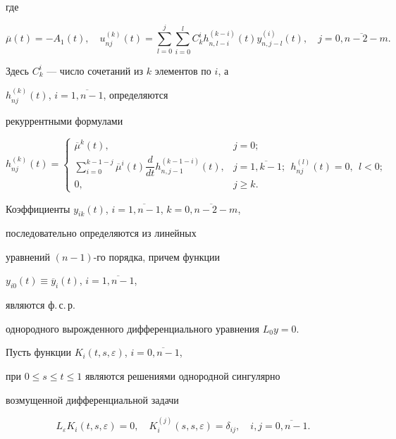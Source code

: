 где


$$


\overline{\mu}(t)=-A_{1}(t),


\quad


u_{nj}^{(k)}(t)=\sum_{l=0}^{j}\sum_{i=0}^{l}


C_{k}^{i}h_{n,l-i}^{(k-i)}(t)y_{n,j-l}^{(i)}(t), \quad 


j=\overline{0,n-2-m}.


$$


Здесь $C_{k}^{i}$ --- число сочетаний из $k$ элементов по $i$, а 


$h_{nj}^{(k)}(t)$, $i=\overline{1,n-1}$, определяются 


рекуррентными формулами


$$


h_{nj}^{(k)}(t)=


\begin{cases}


\overline{\mu}^{k}(t), & j=0; \\ 


\sum\limits_{i=0}^{k-1-j}\overline{\mu}^{i}(t)\dfrac{d}{dt}


h_{n,j-1}^{(k-1-i)}(t), & j=\overline{1,k - 1};


\ \ h_{nj}^{(l)}(t)=0,\ \ l < 0;\\ 


0, & j \ge k.


\end{cases}


$$


Коэффициенты $y_{ik}(t)$, $i=\overline{1,n-1}$, $k=\overline{0,n-2-m}$, 


последовательно определяются из линейных 


уравнений $(n-1)$-го порядка, причем функции 


$y_{i0}(t)\equiv \overline{y}_{i}(t)$, $i=\overline{1,n-1}$,


являются ф.\,с.\,р. 


однородного вырожденного дифференциального уравнения $L_{0}y=0$. 





Пусть функции $K_{i} (t,s,\varepsilon)$, $i=\overline{0,n-1}$, 


при $0 \le s \le t \le 1$ являются решениями однородной сингулярно 


возмущенной дифференциальной задачи


\begin{equation}


\label{eq7}


L_{\varepsilon}K_{i}(t,s,\varepsilon)=0, \quad 


K_{i}^{(j)}(s,s,\varepsilon)=\delta _{ij},\quad i,j=\overline{0,n-1}.


\end{equation}


